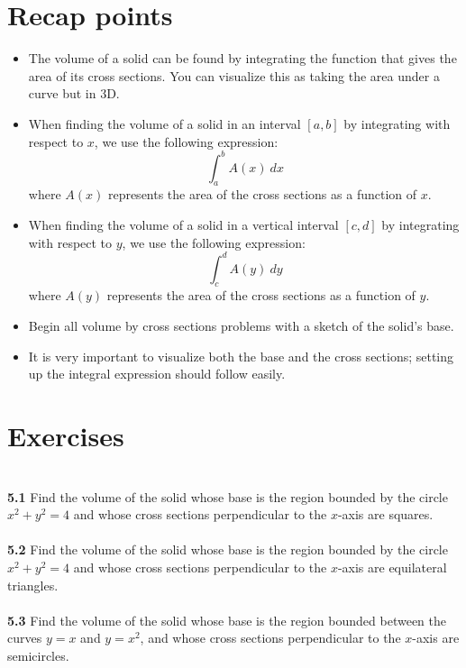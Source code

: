 \documentclass[11pt]{scrartcl}
\begin{document}
\section{Recap points}
\begin{itemize}
    \item The volume of a solid can be found by integrating the function that gives the area of its cross sections. You can visualize this as taking the area under a curve but in 3D.
    \item When finding the volume of a solid in an interval $[a,b]$ by integrating with respect to $x$, we use the following expression: 
    $$\int_a^b A(x) \ dx$$
    \noindent 
    where $A(x)$ represents the area of the cross sections as a function of $x$. 
    \item When finding the volume of a solid in a vertical interval $[c,d]$ by integrating with respect to $y$, we use the following expression: 
    $$\int_c^d A(y) \ dy$$
    \noindent 
    where $A(y)$ represents the area of the cross sections as a function of $y$. 
    \item Begin all volume by cross sections problems with a sketch of the solid's base. 
    \item It is very important to visualize both the base and the cross sections; setting up the integral expression should follow easily. 
\end{itemize}
\section{Exercises}\\
\noindent 
\textbf{5.1} Find the volume of the solid whose base is the region bounded by the circle $x^2+y^2=4$ and whose cross sections perpendicular to the $x$-axis are squares.\\
\\
\noindent 
\textbf{5.2} Find the volume of the solid whose base is the region bounded by the circle $x^2+y^2=4$ and whose cross sections perpendicular to the $x$-axis are equilateral triangles.\\
\\
\noindent 
\textbf{5.3} Find the volume of the solid whose base is the region bounded between the curves $y=x$ and $y=x^2$, and whose cross sections perpendicular to the $x$-axis are semicircles. 
\end{document}
